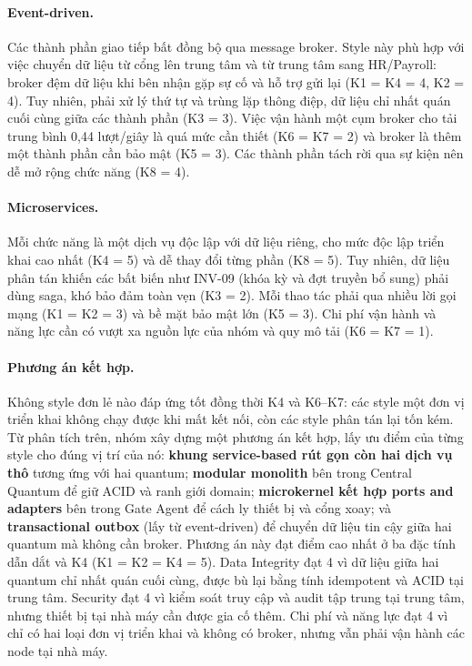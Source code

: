 \paragraph{Event-driven.} Các thành phần giao tiếp bất đồng bộ qua message broker. Style này phù hợp với việc chuyển dữ liệu từ cổng lên trung tâm và từ trung tâm sang HR/Payroll: broker đệm dữ liệu khi bên nhận gặp sự cố và hỗ trợ gửi lại (K1 = K4 = 4, K2 = 4). Tuy nhiên, phải xử lý thứ tự và trùng lặp thông điệp, dữ liệu chỉ nhất quán cuối cùng giữa các thành phần (K3 = 3). Việc vận hành một cụm broker cho tải trung bình 0,44 lượt/giây là quá mức cần thiết (K6 = K7 = 2) và broker là thêm một thành phần cần bảo mật (K5 = 3). Các thành phần tách rời qua sự kiện nên dễ mở rộng chức năng (K8 = 4).

\paragraph{Microservices.} Mỗi chức năng là một dịch vụ độc lập với dữ liệu riêng, cho mức độc lập triển khai cao nhất (K4 = 5) và dễ thay đổi từng phần (K8 = 5). Tuy nhiên, dữ liệu phân tán khiến các bất biến như INV-09 (khóa kỳ và đợt truyền bổ sung) phải dùng saga, khó bảo đảm toàn vẹn (K3 = 2). Mỗi thao tác phải qua nhiều lời gọi mạng (K1 = K2 = 3) và bề mặt bảo mật lớn (K5 = 3). Chi phí vận hành và năng lực cần có vượt xa nguồn lực của nhóm và quy mô tải (K6 = K7 = 1).

\paragraph{Phương án kết hợp.} Không style đơn lẻ nào đáp ứng tốt đồng thời K4 và K6--K7: các style một đơn vị triển khai không chạy được khi mất kết nối, còn các style phân tán lại tốn kém. Từ phân tích trên, nhóm xây dựng một phương án kết hợp, lấy ưu điểm của từng style cho đúng vị trí của nó: \textbf{khung service-based rút gọn còn hai dịch vụ thô} tương ứng với hai quantum; \textbf{modular monolith} bên trong Central Quantum để giữ ACID và ranh giới domain; \textbf{microkernel kết hợp ports and adapters} bên trong Gate Agent để cách ly thiết bị và cổng xoay; và \textbf{transactional outbox} (lấy từ event-driven) để chuyển dữ liệu tin cậy giữa hai quantum mà không cần broker. Phương án này đạt điểm cao nhất ở ba đặc tính dẫn dắt và K4 (K1 = K2 = K4 = 5). Data Integrity đạt 4 vì dữ liệu giữa hai quantum chỉ nhất quán cuối cùng, được bù lại bằng tính idempotent và ACID tại trung tâm. Security đạt 4 vì kiểm soát truy cập và audit tập trung tại trung tâm, nhưng thiết bị tại nhà máy cần được gia cố thêm. Chi phí và năng lực đạt 4 vì chỉ có hai loại đơn vị triển khai và không có broker, nhưng vẫn phải vận hành các node tại nhà máy.

